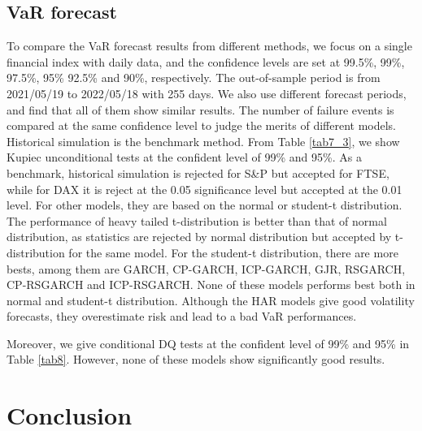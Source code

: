 \documentclass[preprint,12pt,authoryear]{elsarticle}
\begin{document}
\subsection{VaR forecast}
To compare the VaR forecast results from different methods, we focus on a
single financial index with daily data, and the confidence
levels are set at 99.5\%, 99\%, 97.5\%, 95\% 92.5\% and 90\%, respectively.
The out-of-sample period is from 2021/05/19 to 2022/05/18 with 255 days. We also use different forecast periods, and find that all of them show similar results.
The number of failure events is compared at the
same confidence level to judge the merits of different models.
Historical simulation is the benchmark method.
From Table \ref{tab7_3}, we show Kupiec unconditional tests at the confident level of 99\% and 95\%. As a benchmark, historical simulation is rejected for S\&P but accepted for FTSE, while for DAX it is reject at the 0.05 significance level but accepted at the 0.01 level.
For other models, they are based on the normal or student-t distribution. The performance of heavy tailed t-distribution is better than that of normal distribution, as statistics are rejected by normal distribution but accepted by t-distribution for the same model. For the student-t distribution, there are more bests, among them are GARCH, CP-GARCH, ICP-GARCH, GJR, RSGARCH, CP-RSGARCH and ICP-RSGARCH. None of these models performs best both in normal and student-t distribution. Although the HAR models give good volatility forecasts, they overestimate risk and lead to a bad VaR performances.

Moreover, we give conditional DQ tests at the confident level of 99\% and 95\% in Table \ref{tab8}. However, none of these models show significantly good results.


\section{Conclusion}
\end{document}
